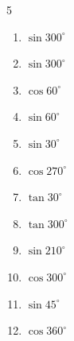 \begin{multicols}{5}
\begin{enumerate}

  \item $\displaystyle \sin{300^\circ}$


  \item $\displaystyle \sin{300^\circ}$


  \item $\displaystyle \cos{60^\circ}$


  \item $\displaystyle \sin{60^\circ}$


\columnbreak %

  \item $\displaystyle \sin{30^\circ}$


  \item $\displaystyle \cos{270^\circ}$

        \phantom{$\displaystyle =0$}

  \item $\displaystyle \tan{30^\circ}$


  \item $\displaystyle \tan{300^\circ}$


  \item $\displaystyle \sin{210^\circ}$


  \item $\displaystyle \cos{300^\circ}$


  \item $\displaystyle \sin{45^\circ}$


  \item $\displaystyle \cos{360^\circ}$

        \phantom{$\displaystyle =1$}


\end{enumerate}
\end{multicols}
